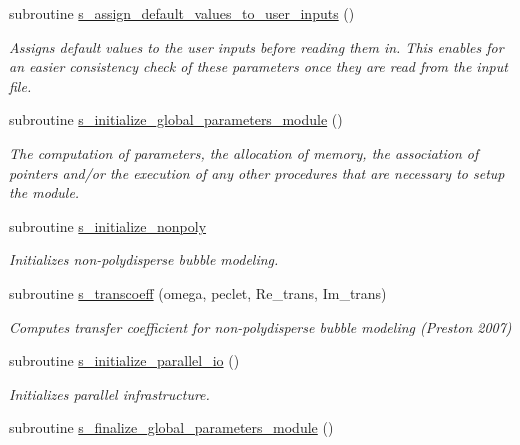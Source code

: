 \begin{DoxyCompactItemize}
\item 
subroutine \hyperlink{namespacem__global__parameters_a433eac37597eb46a3cac84ca0471f5d3}{s\+\_\+assign\+\_\+default\+\_\+values\+\_\+to\+\_\+user\+\_\+inputs} ()
\begin{DoxyCompactList}\small\item\em Assigns default values to the user inputs before reading them in. This enables for an easier consistency check of these parameters once they are read from the input file. \end{DoxyCompactList}\item 
subroutine \hyperlink{namespacem__global__parameters_a8a76198d180cb9736c21dde108cb0dbf}{s\+\_\+initialize\+\_\+global\+\_\+parameters\+\_\+module} ()
\begin{DoxyCompactList}\small\item\em The computation of parameters, the allocation of memory, the association of pointers and/or the execution of any other procedures that are necessary to setup the module. \end{DoxyCompactList}\item 
subroutine \hyperlink{namespacem__global__parameters_a1611e2cf82243c04b04a11281ef67993}{s\+\_\+initialize\+\_\+nonpoly}
\begin{DoxyCompactList}\small\item\em Initializes non-\/polydisperse bubble modeling. \end{DoxyCompactList}\item 
subroutine \hyperlink{namespacem__global__parameters_af52b102f1c17e28aa4ca3070f8806ca6}{s\+\_\+transcoeff} (omega, peclet, Re\+\_\+trans, Im\+\_\+trans)
\begin{DoxyCompactList}\small\item\em Computes transfer coefficient for non-\/polydisperse bubble modeling (Preston 2007) \end{DoxyCompactList}\item 
subroutine \hyperlink{namespacem__global__parameters_a54905a7a2ce9e15fc33ebac52c0d3c27}{s\+\_\+initialize\+\_\+parallel\+\_\+io} ()
\begin{DoxyCompactList}\small\item\em Initializes parallel infrastructure. \end{DoxyCompactList}\item 
subroutine \hyperlink{namespacem__global__parameters_aa2237c2ed3662bbd69ef39e2e92af7bf}{s\+\_\+finalize\+\_\+global\+\_\+parameters\+\_\+module} ()

\end{DoxyCompactItemize}
